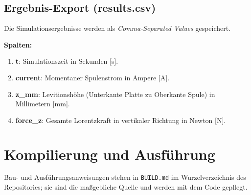 \documentclass[a4paper,12pt]{article}
\begin{document}
\subsection{Ergebnis-Export (results.csv)}
Die Simulationsergebnisse werden als \textit{Comma-Separated Values} gespeichert.

\textbf{Spalten:}
\begin{enumerate}
    \item \textbf{t}: Simulationszeit in Sekunden [s].
    \item \textbf{current}: Momentaner Spulenstrom in Ampere [A].
    \item \textbf{z\_mm}: Levitionshöhe (Unterkante Platte zu Oberkante Spule) in Millimetern [mm].
    \item \textbf{force\_z}: Gesamte Lorentzkraft in vertikaler Richtung in Newton [N].
\end{enumerate}

\section{Kompilierung und Ausführung}
Bau- und Ausführungsanweisungen stehen in \texttt{BUILD.md} im Wurzelverzeichnis
des Repositories; sie sind die maßgebliche Quelle und werden mit dem Code
gepflegt.
\end{document}
